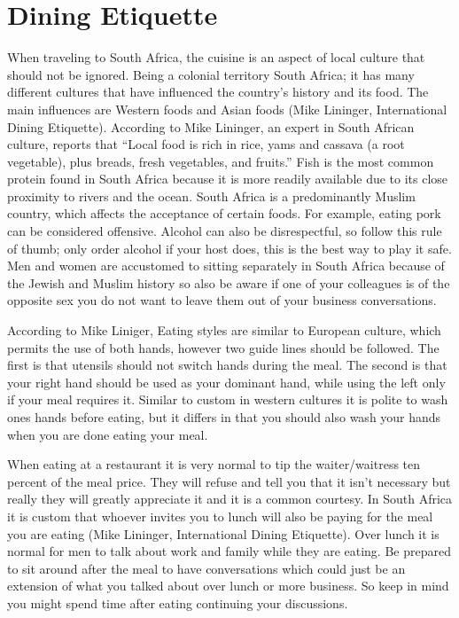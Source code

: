 \documentclass[11pt,a4paper,twoside]{report}
\begin{document}
\section{Dining Etiquette}

When traveling to South Africa, the cuisine is an aspect of local culture that
should not be ignored. Being a colonial territory South Africa; it has many
different cultures that have influenced the country’s history and its food. The
main influences are Western foods and Asian foods (Mike Lininger, International
Dining Etiquette).  According to Mike Lininger, an expert in South African
culture, reports that “Local food is rich in rice, yams and cassava (a root
vegetable), plus breads, fresh vegetables, and fruits.” Fish is the most common
protein found in South Africa because it is more readily available due to its
close proximity to rivers and the ocean. South Africa is a predominantly Muslim
country, which affects the acceptance of certain foods. For example, eating
pork can be considered offensive.  Alcohol can also be disrespectful, so follow
this rule of thumb; only order alcohol if your host does, this is the best way
to play it safe. Men and women are accustomed to sitting separately in South
Africa because of the Jewish and Muslim history so also be aware if one of your
colleagues is of the opposite sex you do not want to leave them out of your
business conversations.

According to Mike Liniger, Eating styles are similar to European culture, which
permits the use of both hands, however two guide lines should be followed. The
first is that utensils should not switch hands during the meal.  The second is
that your right hand should be used as your dominant hand, while using the left
only if your meal requires it. Similar to custom in western cultures it is
polite to wash ones hands before eating, but it differs in that you should also
wash your hands when you are done eating your meal.

When eating at a restaurant it is very normal to tip the waiter/waitress ten
percent of the meal price. They will refuse and tell you that it isn’t
necessary but really they will greatly appreciate it and it is a common
courtesy. In South Africa it is custom that whoever invites you to lunch will
also be paying for the meal you are eating (Mike Lininger, International Dining
Etiquette). Over lunch it is normal for men to talk about work and family while
they are eating. Be prepared to sit around after the meal to have conversations
which could just be an extension of what you talked about over lunch or more
business. So keep in mind you might spend time after eating continuing your
discussions.
\end{document}
